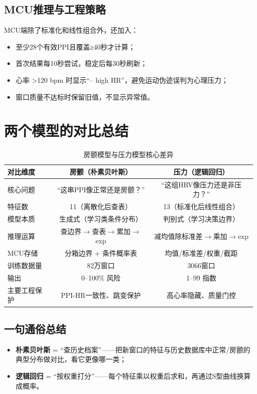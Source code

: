 \documentclass[UTF8]{ctexart}
\begin{document}
\subsection{MCU推理与工程策略}
MCU端除了标准化和线性组合外，还加入：
\begin{itemize}
    \item 至少28个有效PPI且覆盖≥40秒才计算；
    \item 首次结果每10秒尝试，稳定后每30秒刷新；
    \item 心率 >120 bpm 时显示“-- high HR”，避免运动伪迹误判为心理压力；
    \item 窗口质量不达标时保留旧值，不显示异常值。
\end{itemize}

\section{两个模型的对比总结}

\begin{table}[ht]
\centering
\begin{tabular}{@{}lcc@{}}
\toprule
对比维度 & 房颤（朴素贝叶斯） & 压力（逻辑回归） \\
\midrule
核心问题 & “这串PPI像正常还是房颤？” & “这组HRV像压力还是非压力？” \\
特征数 & 11（离散化后查表） & 13（标准化后线性组合） \\
模型本质 & 生成式（学习类条件分布） & 判别式（学习决策边界） \\
推理运算 & 查边界$\rightarrow$查表$\rightarrow$累加$\rightarrow$exp & 减均值除标准差$\rightarrow$乘加$\rightarrow$exp \\
MCU存储 & 分箱边界 + 条件概率表 & 均值/标准差/权重/截距 \\
训练数据量 & 82万窗口 & 3066窗口 \\
输出 & 0--100\% 风险 & 1--99 指数 \\
主要工程保护 & PPI-HR一致性、跳变保护 & 高心率隐藏、质量门控 \\
\bottomrule
\end{tabular}
\caption{房颤模型与压力模型核心差异}
\end{table}

\subsection*{一句通俗总结}
\begin{itemize}
    \item \textbf{朴素贝叶斯} = “查历史档案”——把新窗口的特征与历史数据库中正常/房颤的典型分布做对比，看它更像哪一类；
    \item \textbf{逻辑回归} = “按权重打分”——每个特征乘以权重后求和，再通过S型曲线换算成概率。
\end{itemize}
\end{document}
